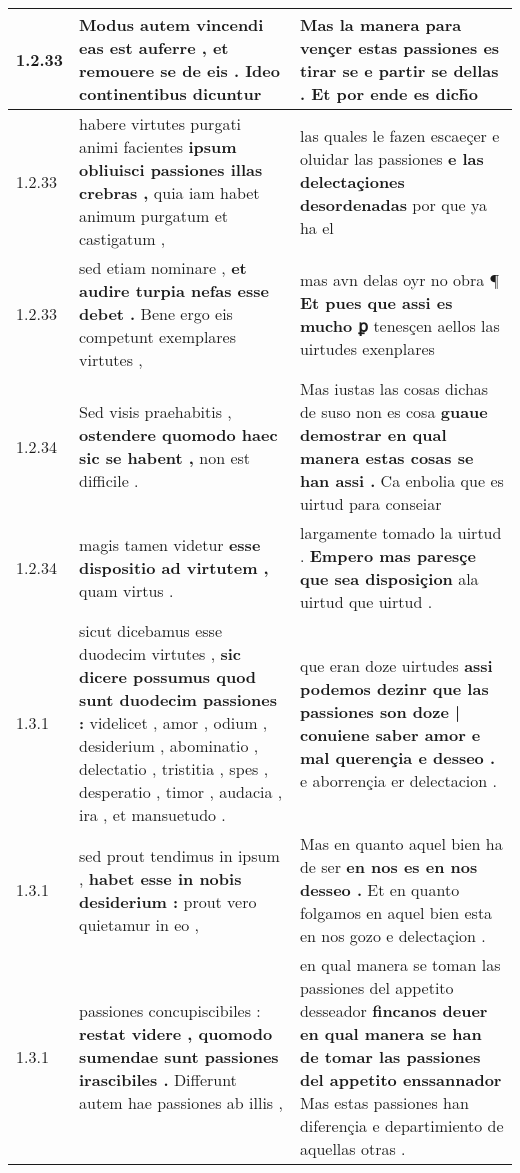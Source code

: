\begin{tabular}{|p{1cm}|p{6.5cm}|p{6.5cm}|}
1.2.33 & Modus autem vincendi eas est auferre , \textbf{ et remouere se de eis . } Ideo continentibus dicuntur & Mas la manera para vençer estas passiones \textbf{ es tirar se e partir se dellas . } Et por ende es dich̃o \\\hline
1.2.33 & habere virtutes purgati animi facientes \textbf{ ipsum obliuisci passiones illas crebras , } quia iam habet animum purgatum et castigatum , & las quales le fazen escaeçer e oluidar las passiones \textbf{ e las delectaçiones desordenadas } por que ya ha el \\\hline
1.2.33 & sed etiam nominare , \textbf{ et audire turpia nefas esse debet . } Bene ergo eis competunt exemplares virtutes , & mas avn delas oyr no obra ¶ \textbf{ Et pues que assi es mucho ꝑ } tenesçen aellos las uirtudes exenplares \\\hline
1.2.34 & Sed visis praehabitis , \textbf{ ostendere quomodo haec sic se habent , } non est difficile . & Mas iustas las cosas dichas de suso non es cosa \textbf{ guaue demostrar en qual manera estas cosas se han assi . } Ca enbolia que es uirtud para conseiar \\\hline
1.2.34 & magis tamen videtur \textbf{ esse dispositio ad virtutem , } quam virtus . & largamente tomado la uirtud . \textbf{ Empero mas paresçe que sea disposiçion } ala uirtud que uirtud . \\\hline
1.3.1 & sicut dicebamus esse duodecim virtutes , \textbf{ sic dicere possumus quod sunt duodecim passiones : } videlicet , amor , odium , desiderium , abominatio , delectatio , tristitia , spes , desperatio , timor , audacia , ira , et mansuetudo . & que eran doze uirtudes \textbf{ assi podemos dezinr que las passiones son doze | conuiene saber amor e mal querençia e desseo . } e aborrençia er delectacion . \\\hline
1.3.1 & sed prout tendimus in ipsum , \textbf{ habet esse in nobis desiderium : } prout vero quietamur in eo , & Mas en quanto aquel bien ha de ser \textbf{ en nos es en nos desseo . } Et en quanto folgamos en aquel bien esta en nos gozo e delectaçion . \\\hline
1.3.1 & passiones concupiscibiles : \textbf{ restat videre , quomodo sumendae sunt passiones irascibiles . } Differunt autem hae passiones ab illis , & en qual manera se toman las passiones del appetito desseador \textbf{ fincanos deuer en qual manera se han de tomar las passiones del appetito enssannador } Mas estas passiones han diferençia e departimiento de aquellas otras . \\\hline

\end{tabular}
